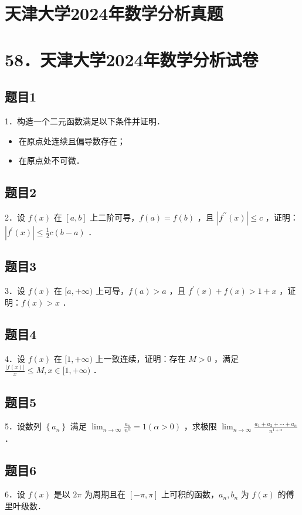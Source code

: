 \documentclass{article}
\begin{document}
\section*{天津大学2024年数学分析真题}
\section*{58．天津大学2024年数学分析试卷}

\subsection{题目1}
1．构造一个二元函数满足以下条件并证明．

\begin{itemize}
  \item[（1）] 在原点处连续且偏导数存在；
  \item[（2）] 在原点处不可微．
\end{itemize}

\subsection{题目2}
2．设 \(f(x)\) 在 \([a, b]\) 上二阶可导，\(f(a)=f(b)\) ，且 \(\left|f^{\prime \prime}(x)\right| \leq c\) ，证明：\(\left|f^{\prime}(x)\right| \leq \frac{1}{2} c(b-a)\) ．

\subsection{题目3}
3．设 \(f(x)\) 在 \([a,+\infty)\) 上可导，\(f(a)>a\) ，且 \(f^{\prime}(x)+f(x)>1+x\) ，证明：\(f(x)>x\) ．

\subsection{题目4}
4．设 \(f(x)\) 在 \([1,+\infty)\) 上一致连续，证明：存在 \(M>0\) ，满足 \(\frac{|f(x)|}{x} \leq M, x \in[1,+\infty)\) ．

\subsection{题目5}
5．设数列 \(\left\{a_{n}\right\}\) 满足 \(\lim _{n \rightarrow \infty} \frac{a_{n}}{n^{\alpha}}=1(\alpha>0)\) ，求极限 \(\lim _{n \rightarrow \infty} \frac{a_{1}+a_{2}+\cdots+a_{n}}{n^{1+\alpha}}\) ．

\subsection{题目6}
6．设 \(f(x)\) 是以 \(2 \pi\) 为周期且在 \([-\pi, \pi]\) 上可积的函数，\(a_{n}, b_{n}\) 为 \(f(x)\) 的傅里叶级数．
\end{document}
